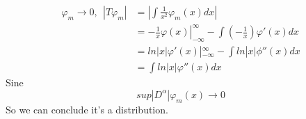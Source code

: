 \documentclass{article}
\begin{document}
\subsubsection{}
\begin{align*}
\varphi_m \rightarrow 0, \ \ |T \varphi_m| & = |\int \frac{1}{x^2}  \varphi_m(x) dx| \\
& = \left.- \frac{1}{x} \varphi(x) \right|_{-\infty}^\infty - \int (-\frac{1}{x}) \varphi'(x)dx \\
&= ln|x| \varphi'(x)|_{-\infty}^\infty - \int ln|x| \phi''(x) dx \\
&= \int ln|x| \varphi''(x) dx
\end{align*}
Sine \[
	sup|D^\alpha| \varphi_m(x) \rightarrow 0
\]
So we can conclude it's a distribution.
\end{document}
